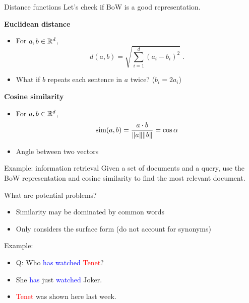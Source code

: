 \documentclass[usenames,dvipsnames,notes,11pt,aspectratio=169]{beamer}
\begin{document}
\begin{frame}
    {Distance functions}
    Let's check if BoW is a good representation.

    \textbf{Euclidean distance}\\
    \begin{itemize}
        \item[] For $a,b\in\mathbb{R}^d$,
            $$
            d(a,b) = \sqrt{\sum_{i=1}^d(a_i-b_i)^2} \;.
            $$
            \pause
        \item[] What if $b$ repeats each sentence in $a$ twice?
            \pause ($b_i=2a_i$)
    \end{itemize}

    \pause
    \textbf{Cosine similarity}\\
    \begin{itemize}
        \item[] For $a,b\in\mathbb{R}^d$,
            $$
            \text{sim}(a,b) = \frac{a\cdot b}{\|a\|\|b\|} = \cos\alpha
            $$
        \item[] Angle between two vectors
    \end{itemize}
\end{frame}

\begin{frame}
    {Example: information retrieval}
    Given a set of documents and a query,
    use the BoW representation and cosine similarity
    to find the most relevant document.

    What are potential problems?\pause
    \begin{itemize}
        \item Similarity may be dominated by common words
        \item Only considers the surface form (\eg do not account for synonyms)
    \end{itemize}
    

    \pause
    Example:\\
    \begin{itemize}
        \item[] Q: Who \textcolor{blue}{has watched} \textcolor{red}{Tenet}?
        \item[] She \textcolor{blue}{has} just \textcolor{blue}{watched} Joker.
        \item[] \textcolor{red}{Tenet} was shown here last week.
    \end{itemize}
\end{frame}
\end{document}
